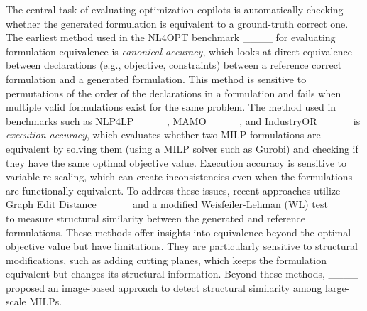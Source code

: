 The central task of evaluating optimization copilots 
is automatically checking 
whether the generated formulation 
is equivalent to a ground-truth correct one.
The earliest method used in the NL4OPT benchmark ____ for evaluating formulation equivalence is \emph{canonical accuracy}, which looks at direct equivalence between declarations (e.g., objective, constraints) between a reference correct formulation and a generated formulation. 
This method is sensitive to permutations of the order of the declarations in a formulation and fails when multiple valid formulations exist for the same problem. 
The method used in benchmarks such as NLP4LP ____, MAMO ____, and IndustryOR ____ is \emph{execution accuracy}, which evaluates whether two MILP formulations are equivalent by solving them (using a MILP solver such as Gurobi) and checking if they have the same optimal objective value. 
Execution accuracy is sensitive to variable re-scaling, which can create inconsistencies even when the formulations are functionally equivalent. 
To address these issues, recent approaches utilize Graph Edit Distance ____ and a modified Weisfeiler-Lehman (WL) test ____ to measure structural similarity between the generated and reference formulations. 
These methods offer insights into equivalence beyond the optimal objective value but have limitations.
They are particularly sensitive to structural modifications, such as adding cutting planes, 
which keeps the formulation equivalent but changes its structural information. 
Beyond these methods, ____ proposed an image-based approach to detect structural similarity among large-scale MILPs.